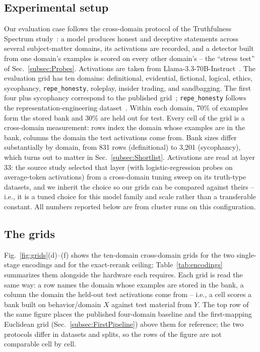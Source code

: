 \documentclass[conference]{IEEEtran}
\begin{document}
\subsection{Experimental setup}
\label{subsec:Setup}
Our evaluation case follows the cross-domain protocol of the
Truthfulness Spectrum study~\cite{ying2026spectrum}: a model produces
honest and deceptive statements across several subject-matter
domains, its activations are recorded, and a detector built from one
domain's examples is scored on every other domain's -- the ``stress
test'' of Sec.~\ref{subsec:Probes}. Activations are taken from
Llama-3.3-70B-Instruct~\cite{llama3herd}. The evaluation grid has ten
domains:
definitional, evidential, fictional, logical, ethics, sycophancy,
\texttt{repe\_honesty}, roleplay, insider trading, and sandbagging. The
first four plus sycophancy correspond to the published
grid~\cite{ying2026spectrum}; \texttt{repe\_honesty} follows the
representation-engineering dataset~\cite{zou2023repe}. Within each
domain, 70\% of examples form the stored bank and 30\% are held out for
test. Every cell of the grid is a cross-domain measurement: rows index
the domain whose examples are in the bank, columns the domain the test
activations come from. Bank sizes differ substantially by domain, from
831 rows (definitional) to 3{,}201 (sycophancy), which turns out to
matter in Sec.~\ref{subsec:Shortlist}. Activations are read at layer
33: the source study selected that layer (with logistic-regression
probes on average-token activations) from a cross-domain tuning sweep
on its truth-type datasets, and we inherit the choice so our grids
can be compared against theirs -- i.e., it is a tuned choice for this
model family and scale rather than a transferable constant. All
numbers reported below are from cluster runs on this
configuration.

\subsection{The grids}
\label{subsec:Grids}

Fig.~\ref{fig:grids}(d)--(f) shows the ten-domain cross-domain grids
for the two single-stage encodings and for the exact-rerank ceiling;
Table~\ref{tab:encodings} summarizes them alongside the hardware each
requires. Each grid is read the same way: a row names the domain
whose examples are stored in the bank, a column the domain the
held-out test activations come from -- i.e., a cell scores a bank
built on behavior/domain $X$ against test material from
$Y$. The top row of the same figure places the published
four-domain baseline and the first-mapping Euclidean grid
(Sec.~\ref{subsec:FirstPipeline}) above them for reference; the two
protocols differ in datasets and splits, so the rows of the figure are
not comparable cell by cell.
\end{document}
